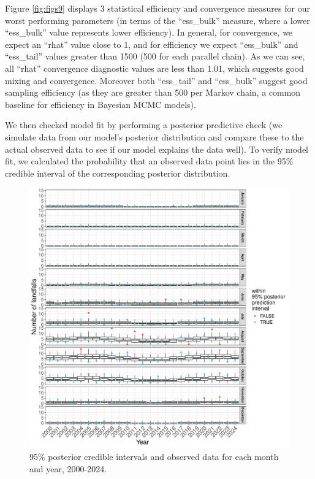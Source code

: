 \documentclass[
]{article}
\begin{document}
Figure \ref{fig:figs9} displays 3 statistical efficiency and convergence measures for our worst performing parameters (in terms of the ``ess\_bulk'' measure, where a lower ``ess\_bulk'' value represents lower efficiency). In general, for convergence, we expect an ``rhat'' value close to 1, and for efficiency we expect ``ess\_bulk'' and ``ess\_tail'' values greater than 1500 (500 for each parallel chain). As we can see, all ``rhat'' convergence diagnostic values are less than 1.01, which suggests good mixing and convergence. Moreover both ``ess\_tail'' and ``ess\_bulk'' suggest good sampling efficiency (as they are greater than 500 per Markov chain, a common baseline for efficiency in Bayesian MCMC models).

We then checked model fit by performing a posterior predictive check (we simulate data from our model's posterior distribution and compare these to the actual observed data to see if our model explains the data well). To verify model fit, we calculated the probability that an observed data point lies in the 95\% credible interval of the corresponding posterior distribution.

\begin{figure}

{\centering \includegraphics[width=1\linewidth]{../outputs/bayesian-analysis-monthly-freq/model-HSGP/HSGP-post-pred-checks} 

}

\caption{95\% posterior credible intervals and observed data for each month and year, 2000-2024.}\label{fig:figs10}
\end{figure}
\end{document}
